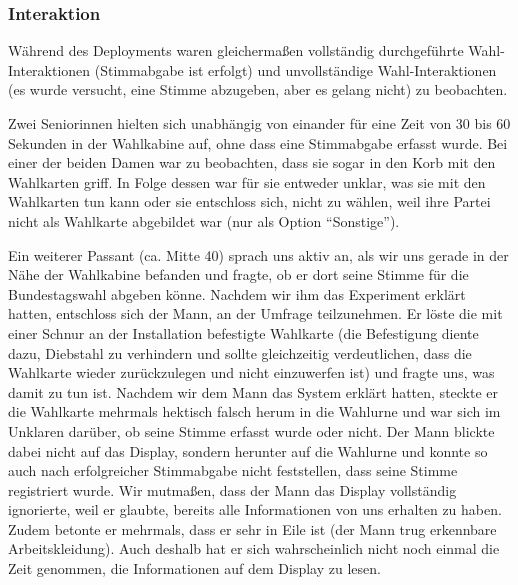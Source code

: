 \subsubsection{Interaktion}\label{interaktion}

Während des Deployments waren gleichermaßen vollständig durchgeführte Wahl-Interaktionen (Stimmabgabe ist erfolgt) und unvollständige Wahl-Interaktionen (es wurde versucht, eine Stimme abzugeben, aber es gelang nicht) zu beobachten.

Zwei Seniorinnen hielten sich unabhängig von einander für eine Zeit von 30 bis 60 Sekunden in der Wahlkabine auf, ohne dass eine Stimmabgabe erfasst wurde.
Bei einer der beiden Damen war zu beobachten, dass sie sogar in den Korb mit den Wahlkarten griff.
In Folge dessen war für sie entweder unklar, was sie mit den Wahlkarten tun kann oder sie entschloss sich, nicht zu wählen, weil ihre Partei nicht als Wahlkarte abgebildet war (nur als Option ``Sonstige'').

Ein weiterer Passant (ca. Mitte 40) sprach uns aktiv an, als wir uns gerade in der Nähe der Wahlkabine befanden und fragte, ob er dort seine Stimme für die Bundestagswahl abgeben könne.
Nachdem wir ihm das Experiment erklärt hatten, entschloss sich der Mann, an der Umfrage teilzunehmen.
Er löste die mit einer Schnur an der Installation befestigte Wahlkarte (die Befestigung diente dazu, Diebstahl zu verhindern und sollte gleichzeitig verdeutlichen, dass die Wahlkarte wieder zurückzulegen und nicht einzuwerfen ist) und fragte uns, was damit zu tun ist.
Nachdem wir dem Mann das System erklärt hatten, steckte er die Wahlkarte mehrmals hektisch falsch herum in die Wahlurne und war sich im Unklaren darüber, ob seine Stimme erfasst wurde oder nicht.
Der Mann blickte dabei nicht auf das Display, sondern herunter auf die Wahlurne und konnte so auch nach erfolgreicher Stimmabgabe nicht feststellen, dass seine Stimme registriert wurde.
Wir mutmaßen, dass der Mann das Display vollständig ignorierte, weil er glaubte, bereits alle Informationen von uns erhalten zu haben.
Zudem betonte er mehrmals, dass er sehr in Eile ist (der Mann trug erkennbare Arbeitskleidung).
Auch deshalb hat er sich wahrscheinlich nicht noch einmal die Zeit genommen, die Informationen auf dem Display zu lesen.